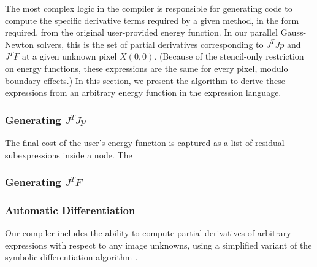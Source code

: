 The most complex logic in the compiler is responsible for generating code to compute the specific derivative terms required by a given method, in the form required, from the original user-provided energy function.
In our parallel Gauss-Newton solvers, this is the set of partial derivatives corresponding to $J^TJp$ and $J^TF$ at a given unknown pixel $X(0,0)$. (Because of the stencil-only restriction on energy functions, these expressions are the same for every pixel, modulo boundary effects.)
In this section, we present the algorithm to derive these expressions from an arbitrary energy function in the \OPT{} expression language.

\subsubsection{Generating $J^TJp$}
\label{sec:jtj_generation}

\FigJTJAlgorithm

The final cost of the user's energy function is captured as a list of residual subexpressions inside a  node. 
The 




\subsubsection{Generating $J^TF$}
\label{sec:jtf_generation}



\subsubsection{Automatic Differentiation}
\label{sec:autodiff}
Our compiler includes the ability to compute partial derivatives of arbitrary expressions with respect to any image unknowns, using a simplified variant of the \DSTAR symbolic differentiation algorithm \cite{dstar}.


